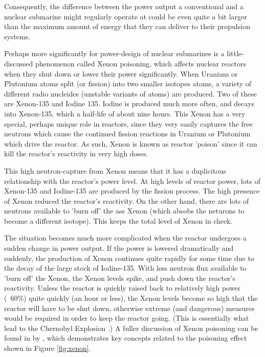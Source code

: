 \documentclass{article}\usepackage[]{graphicx}\usepackage[]{color}
\begin{document}
Consequently, the difference between the power output a conventional and a nuclear submarine might regularly operate at could be even quite a bit larger than the maximum amount of energy that they can deliver to their propulsion systems.  

Perhaps more significantly for power-design of nuclear submarines is a little-discussed phenomenon called Xenon poisoning, which affects nuclear reactors when they shut down or lower their power significantly. When Uranium or Plutonium atoms split (or fission) into two smaller isotopes atoms, a variety of different radio nucleides (unstable variants of atoms) are produced.  Two of these are Xenon-135 and Iodine 135.  Iodine is produced much more often, and decays into Xenon-135, which a half-life of about nine hours.  This Xenon has a very special, perhaps unique role in reactors, since they very easily captures the free neutrons which cause the continued fission reactions in Uranium or Plutonium which drive the reactor.  As such, Xenon is known as reactor 'poison' since it can kill the reactor's reactivity in very high doses.

This high neutron-capture from Xenon means that it has a duplicitous relationship with the reactor's power level.  At high levels of reactor power, lots of Xenon-135 and Iodine-135 are produced by the fission process.  The high presence of Xenon reduced the reactor's reactivity.  On the other hand, there are lots of neutrons available to 'burn off' the ass Xenon (which absobs the neturons to become a different isotope).  This keeps the total level of Xenon in check.  

The situation becomes much more complicated when the reactor undergoes a sudden change in power output.  If the power is lowered dramatically and suddenly, the production of Xenon continues quite rapidly for some time due to the decay of the large stock of Iodine-135.  With less neutron flux available to 'burn off' the Xenon, the Xenon levels spike, and push down the reactor's reactivity.  Unless the reactor is quickly raised back to relatively high power (~60\%) quite quickly (an hour or less), the Xenon levels become so high that the reactor will have to be shut down, otherwise extreme (and dangerous) measures would be required in order to keep the reactor going.  (This is essentially what lead to the Chernobyl Explosion \parencite{WNA2009}.)  A fuller discussion of Xenon poisoning can be found in   by \citeauthor{garland2005}, which demonstrates key concepts related to the poisoning effect shown in Figure \ref{fig:xenon}.
\end{document}
